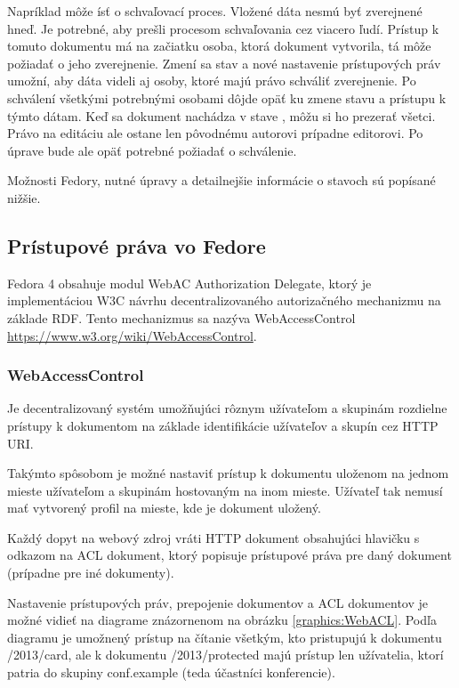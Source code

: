 \documentclass[thesis=M,slovak]{FITthesis}[2013/05/06]
\begin{document}
Napríklad môže ísť o schvaľovací proces. Vložené dáta nesmú byť zverejnené hneď. Je potrebné, aby prešli procesom schvaľovania cez viacero ľudí. Prístup k tomuto dokumentu má na začiatku osoba, ktorá dokument vytvorila, tá môže požiadať o jeho zverejnenie. Zmení sa stav a nové nastavenie prístupových práv umožní, aby dáta videli aj osoby, ktoré majú právo schváliť zverejnenie. Po schválení všetkými potrebnými osobami dôjde opäť ku zmene stavu a prístupu k týmto dátam. Keď sa dokument nachádza v stave , môžu si ho prezerať všetci. Právo na editáciu ale ostane len pôvodnému autorovi prípadne editorovi. Po úprave bude ale opäť potrebné požiadať o schválenie.

Možnosti Fedory, nutné úpravy a detailnejšie informácie o stavoch sú popísané nižšie.

\subsection{Prístupové práva vo Fedore}
Fedora 4 obsahuje modul WebAC Authorization Delegate, ktorý je implementáciou W3C návrhu decentralizovaného autorizačného mechanizmu na základe RDF. Tento mechanizmus sa nazýva WebAccessControl \url{https://www.w3.org/wiki/WebAccessControl}.

\subsubsection{WebAccessControl}
Je decentralizovaný systém umožňujúci rôznym užívateľom a skupinám rozdielne prístupy k dokumentom na základe identifikácie užívateľov a skupín cez HTTP URI. 

Takýmto spôsobom je možné nastaviť prístup k dokumentu uloženom na jednom mieste užívateľom a skupinám hostovaným na inom mieste. Užívateľ tak nemusí mať vytvorený profil na mieste, kde je dokument uložený.

Každý dopyt na webový zdroj vráti HTTP dokument obsahujúci hlavičku s odkazom na ACL dokument, ktorý popisuje prístupové práva pre daný dokument (prípadne pre iné dokumenty).
\cite{WebAccessControl}

Nastavenie prístupových práv, prepojenie dokumentov a ACL dokumentov je možné vidieť na diagrame znázornenom na obrázku \ref{graphics:WebACL}. Podľa diagramu je umožnený prístup na čítanie všetkým, kto pristupujú k dokumentu /2013/card, ale k dokumentu /2013/protected majú prístup len užívatelia, ktorí patria do skupiny conf.example (teda účastníci konferencie).
\end{document}

